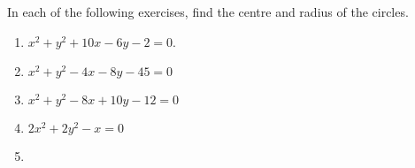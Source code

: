 In each of the following exercises,  find the centre and radius of the circles.
\begin{enumerate}[label=\thesection.\arabic*,ref=\thesection.\theenumi,resume*]
\item  $x^2+y^2 +10x -6y -2=0$. 
	 \\
		\solution
\label{chapters/11/11/1/6}
%
\item  $x^{2}+y^{2}-4 x-8 y-45=0$
	 \\
		\solution
\label{chapters/11/11/1/7}
%
\item  $x^{2}+y^{2}-8 x+10 y-12=0$ 
	 \\
		\solution
\label{chapters/11/11/1/8}
%
\item  $2 x^{2}+2 y^{2}-x=0$
	 \\
		\solution
\label{chapters/11/11/1/9}
%
\item
%
\end{enumerate}
